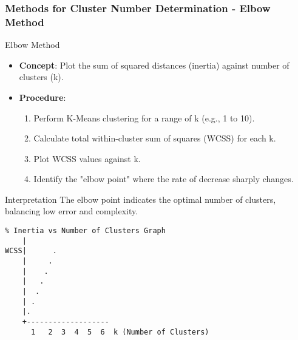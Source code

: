\documentclass[aspectratio=169]{beamer}
\begin{document}
\begin{frame}[fragile]
    \frametitle{Methods for Cluster Number Determination - Elbow Method}
    \begin{block}{Elbow Method}
        \begin{itemize}
            \item \textbf{Concept}: Plot the sum of squared distances (inertia) against number of clusters (k).
            \item \textbf{Procedure}:
            \begin{enumerate}
                \item Perform K-Means clustering for a range of k (e.g., 1 to 10).
                \item Calculate total within-cluster sum of squares (WCSS) for each k.
                \item Plot WCSS values against k.
                \item Identify the "elbow point" where the rate of decrease sharply changes.
            \end{enumerate}
        \end{itemize}
    \end{block}
    
    \begin{block}{Interpretation}
        The elbow point indicates the optimal number of clusters, balancing low error and complexity.
    \end{block}
    
    \begin{lstlisting}
% Inertia vs Number of Clusters Graph
    |
WCSS|      .
    |     .
    |    .
    |   .
    |  .
    | .
    |. 
    +-------------------
      1   2  3  4  5  6  k (Number of Clusters)
    \end{lstlisting}
\end{frame}
\end{document}
